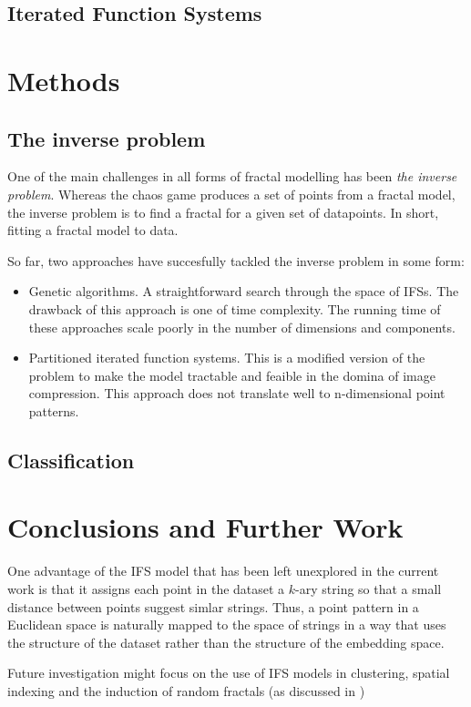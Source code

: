 \documentclass{article}
\theoremstyle{definition}
\begin{document}
\subsection{Iterated Function Systems}


\section{Methods}
\subsection{The inverse problem}
One of the main challenges in all forms of fractal modelling has been \textit{the inverse problem}. Whereas the chaos game produces a set of points from a fractal model, the inverse problem is to find a fractal for a given set of datapoints. In short, fitting a fractal model to data.

So far, two approaches have succesfully tackled the inverse problem in some form:
\begin{itemize}
  \item Genetic algorithms. A straightforward search through the space of IFSs. The drawback of this approach is one of time complexity. The running time of these approaches scale poorly in the number of dimensions and components.
  \item Partitioned iterated function systems. This is a modified version of the problem to make the model tractable and feaible in the domina of image compression. This approach does not translate well to n-dimensional point patterns.
\end{itemize}



\subsection{Classification}
\section{Conclusions and Further Work}

One advantage of the IFS model that has been left unexplored in the current work is that it assigns each point in the dataset a $k$-ary string so that a small distance between points suggest simlar strings. Thus, a point pattern in a Euclidean space is naturally mapped to the space of strings in a way that uses the structure of the dataset rather than the structure of the embedding space.

Future investigation might focus on the use of IFS models in clustering, spatial indexing and the induction of random fractals (as discussed in \cite{})
\end{document}
